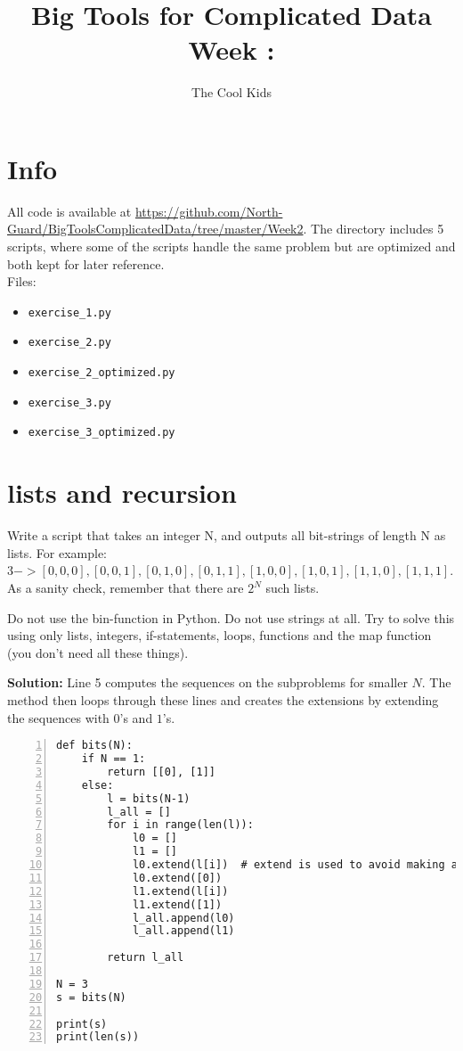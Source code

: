 \documentclass[12pt]{report}
\author{The Cool Kids}
\title{Big Tools for Complicated Data \\Week \weeknr: \weektitle}
\begin{document}
\maketitle

\section*{Info}

All code is available at \url{https://github.com/North-Guard/BigToolsComplicatedData/tree/master/Week2}. 
The directory includes 5 scripts, where some of the scripts handle the same problem but are optimized and both kept for later reference. \\

Files:
\begin{itemize}
\item \lstinline|exercise_1.py|
\item \lstinline|exercise_2.py|
\item \lstinline|exercise_2_optimized.py|
\item \lstinline|exercise_3.py|
\item \lstinline|exercise_3_optimized.py|
\end{itemize}

\setcounter{chapter}{1}

\clearpage
\section{lists and recursion}
Write a script that takes an integer N, and outputs all bit-strings of length N as lists. For example: $3 -> [0,0,0], [0,0,1],[0,1,0],[0,1,1],[1,0,0],[1,0,1],[1,1,0],[1,1,1]$. As a sanity check, remember that there are $2^N$ such lists.

Do not use the bin-function in Python. Do not use strings at all. Try to solve this using only lists, integers, if-statements, loops, functions and the map function (you don’t need all these things).

\textbf{Solution:}
Line 5 computes the sequences on the subproblems for smaller $N$. The method then loops through these lines and creates the extensions by extending the sequences with $0$'s and $1$'s.
\begin{framed}
\begin{lstlisting}[style=Python, numbers=left]
def bits(N):
    if N == 1:
        return [[0], [1]]
    else:
        l = bits(N-1)
        l_all = []
        for i in range(len(l)):
            l0 = []
            l1 = []
            l0.extend(l[i])  # extend is used to avoid making a list of lists, but instead appending the elements of the list to the new list
            l0.extend([0])
            l1.extend(l[i])
            l1.extend([1])
            l_all.append(l0)
            l_all.append(l1)

        return l_all

N = 3
s = bits(N)

print(s)
print(len(s))
\end{lstlisting}
\end{framed}
\end{document}
